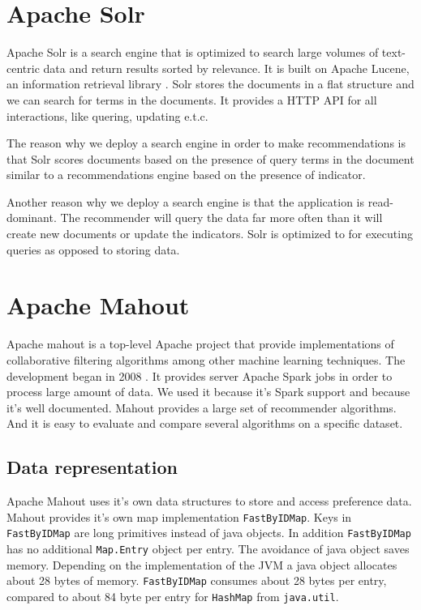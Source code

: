 \section{Apache Solr}
\label{sec:solr}

Apache Solr is a search engine that is optimized to search large volumes of text-centric data and return results sorted by relevance. It is built on Apache Lucene, an information retrieval library \cite{grainger}. Solr stores the documents in a flat structure and we can search for terms in the documents. It provides a HTTP API for all interactions, like quering, updating e.t.c.

The reason why we deploy a search engine in order to make recommendations is that Solr scores documents based on the presence of query terms in the document similar to a recommendations engine based on the presence of indicator.

Another reason why we deploy a search engine is that the application is read-dominant. The recommender will query the data far more often than it will create new documents or update the indicators. Solr is optimized to for executing queries as opposed to storing data.

\section{Apache Mahout}
\label{sec:mahout}

Apache mahout is a top-level Apache project that provide implementations of collaborative filtering algorithms among other machine learning techniques. The development began in 2008 \cite{Owen}. It provides server Apache Spark jobs in order to process large amount of data. We used it because it's Spark support and because it's well documented.
Mahout provides a large set of recommender algorithms. And it is easy to evaluate and compare several algorithms on a specific dataset.

\subsection{Data representation}
\label{sec:datarepresentation}

Apache Mahout uses it's own data structures to store and access preference data. Mahout provides it's own map implementation \verb|FastByIDMap|. Keys in \verb|FastByIDMap| are long primitives instead of java objects. In addition \verb|FastByIDMap| has no additional \verb|Map.Entry| object per entry. The avoidance of java object saves memory. Depending on the implementation of the JVM a java object allocates about 28 bytes of memory. \verb|FastByIDMap| consumes about 28 bytes per entry, compared to about 84 byte per entry for \verb|HashMap| from \verb|java.util|.

